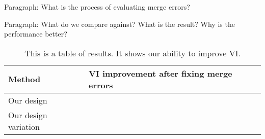 Paragraph: What is the process of evaluating merge errors?

Paragraph: What do we compare against? What is the result? Why is the performance better?

\begin{table}[t]
\begin{tabular}{ll}
\toprule
Method & VI improvement after fixing merge errors \\
\midrule
Our design &  \\
Our design variation & \\
\bottomrule
\end{tabular}
\caption{This is a table of results. It shows our ability to improve VI.}
\end{table}


